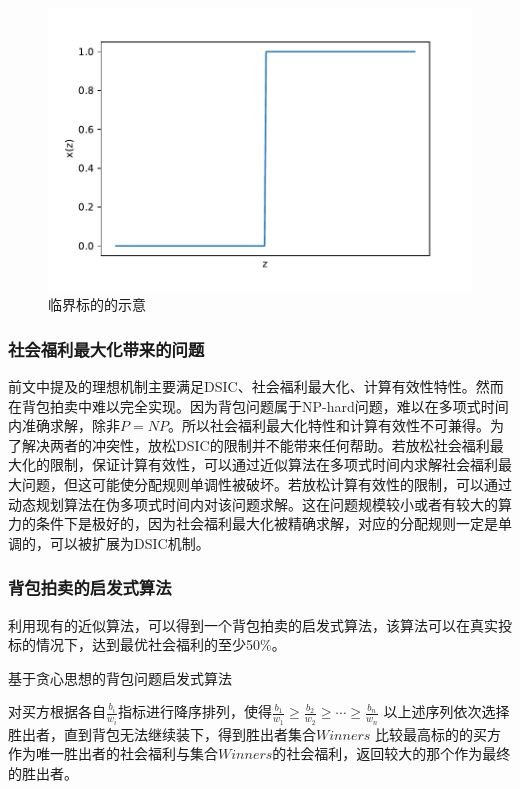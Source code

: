 \documentclass[promaster]{thesis-uestc}
\begin{document}
\begin{figure}[h]
    \includegraphics[width=350pt]{pic/jieyuefenpei.pdf}
    \caption{临界标的的示意}
    \label{criticalbid}
\end{figure}

\subsubsection{社会福利最大化带来的问题}
前文中提及的理想机制主要满足DSIC、社会福利最大化、计算有效性特性。然而在背包拍卖中难以完全实现。因为背包问题属于NP-hard问题，难以在多项式时间内准确求解，除非$P=NP$。所以社会福利最大化特性和计算有效性不可兼得。为了解决两者的冲突性，放松DSIC的限制并不能带来任何帮助。若放松社会福利最大化的限制，保证计算有效性，可以通过近似算法在多项式时间内求解社会福利最大问题，但这可能使分配规则单调性被破坏。若放松计算有效性的限制，可以通过动态规划算法在伪多项式时间内对该问题求解。这在问题规模较小或者有较大的算力的条件下是极好的，因为社会福利最大化被精确求解，对应的分配规则一定是单调的，可以被扩展为DSIC机制。

\subsubsection{背包拍卖的启发式算法}
利用现有的近似算法，可以得到一个背包拍卖的启发式算法，该算法可以在真实投标的情况下，达到最优社会福利的至少50\%。

\begin{algorithm}[H]
\caption{基于贪心思想的背包问题启发式算法}
对买方根据各自$\frac{b_i}{w_i}$指标进行降序排列，使得$\frac{b_1}{w_1}\geq\frac{b_2}{w_2}\geq \cdots \geq \frac{b_n}{w_n}$\;
以上述序列依次选择胜出者，直到背包无法继续装下，得到胜出者集合$Winners$\;
比较最高标的的买方作为唯一胜出者的社会福利与集合$Winners$的社会福利，返回较大的那个作为最终的胜出者。\;
\end{algorithm}
\end{document}

